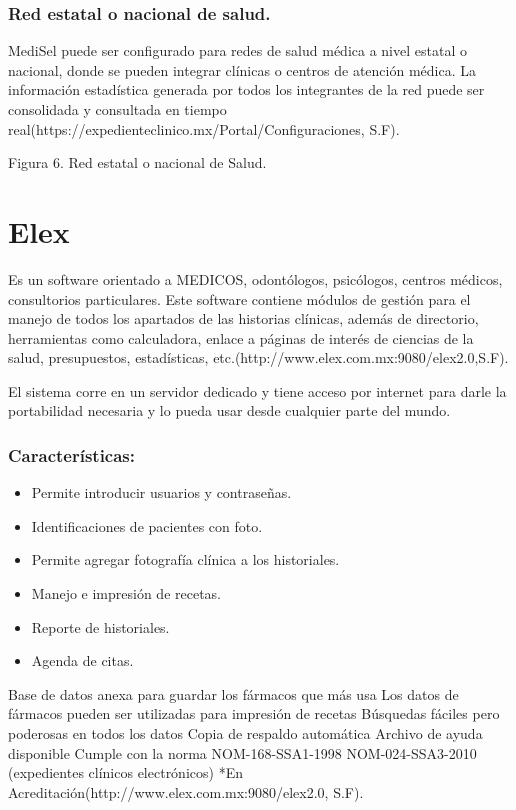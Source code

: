 \subsubsection{Red estatal o nacional de salud.}
MediSel puede ser configurado para redes de salud médica a nivel estatal o nacional, donde se pueden integrar clínicas o centros de atención médica. La información estadística generada por todos los integrantes de la red puede ser consolidada y consultada en tiempo real(https://expedienteclinico.mx/Portal/Configuraciones, S.F).

				Figura 6. Red estatal o nacional de Salud.



\section{Elex}
Es un software orientado a MEDICOS, odontólogos, psicólogos, centros médicos, consultorios particulares. Este software contiene módulos de gestión para el manejo de todos los apartados de las historias clínicas, además de directorio, herramientas como calculadora, enlace a páginas de interés de ciencias de la salud, presupuestos, estadísticas, etc.(http://www.elex.com.mx:9080/elex2.0,S.F).

El sistema corre en un servidor dedicado y tiene acceso por internet para darle la portabilidad necesaria y lo pueda usar desde cualquier parte del mundo.
\subsubsection{Características:}
  \begin{itemize}
    \item Permite introducir usuarios y contraseñas.
    \item Identificaciones de pacientes con foto.
    \item Permite agregar fotografía clínica a los historiales.
    \item Manejo e impresión de recetas.
    \item Reporte de historiales.
    \item Agenda de citas.

  \end{itemize}


Base de datos anexa para guardar los fármacos que más usa
Los datos de fármacos pueden ser utilizadas para impresión de recetas
Búsquedas fáciles pero poderosas en todos los datos
Copia de respaldo automática
Archivo de ayuda disponible
Cumple con la norma NOM-168-SSA1-1998
NOM-024-SSA3-2010 (expedientes clínicos electrónicos) *En Acreditación(http://www.elex.com.mx:9080/elex2.0, S.F).

